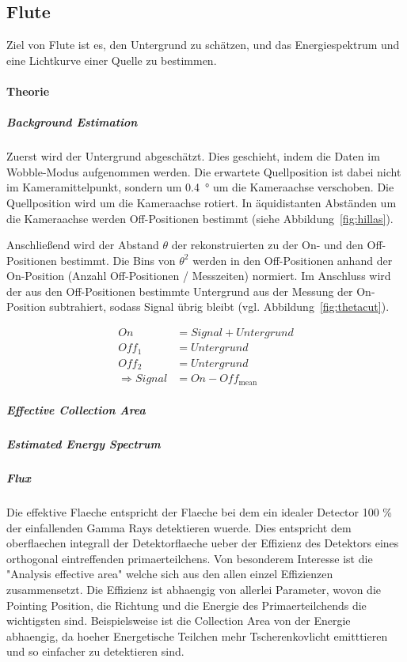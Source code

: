 \subsection{Flute}%
\label{sub:flute}

Ziel von Flute ist es,
den Untergrund zu schätzen,
und das Energiespektrum und
eine Lichtkurve einer Quelle zu bestimmen.

\paragraph{Theorie}%

\subparagraph{Background Estimation}
Zuerst wird der Untergrund abgeschätzt.
Dies geschieht, indem die Daten im Wobble-Modus aufgenommen werden.
Die erwartete Quellposition ist dabei nicht im
Kameramittelpunkt,
sondern um
\SI{0.4}{\degree} um die Kameraachse
verschoben.
Die Quellposition wird um die Kameraachse rotiert.
In äquidistanten Abständen um die Kameraachse werden Off-Positionen bestimmt
(siehe Abbildung~\ref{fig:hillas}).

Anschließend wird der Abstand $\theta$ der rekonstruierten
zu der On- und den Off-Positionen bestimmt.
Die Bins von $\theta^2$ werden in den Off-Positionen
anhand der On-Position (Anzahl Off-Positionen / Messzeiten) normiert.
Im Anschluss wird der aus den Off-Positionen bestimmte Untergrund
aus der Messung der On-Position subtrahiert, sodass Signal übrig bleibt
(vgl. Abbildung~\ref{fig:thetacut}).


\begin{align*}
    On &= Signal + Untergrund \\
    Off_{1} &= Untergrund \\
    Off_{2} &= Untergrund \\
    \Rightarrow Signal &= On - Off_{\text{mean}}
\end{align*}

\subparagraph{Effective Collection Area}
\subparagraph{Estimated Energy Spectrum}
\subparagraph{Flux}
Die effektive Flaeche entspricht der Flaeche bei dem ein idealer Detector 100 \%
der einfallenden Gamma Rays detektieren wuerde.
Dies entspricht dem oberflaechen integrall der Detektorflaeche 
ueber der Effizienz des Detektors eines orthogonal eintreffenden
primaerteilchens.
Von besonderem Interesse ist die "Analysis effective area" welche sich aus den
allen einzel Effizienzen zusammensetzt. 
Die Effizienz ist abhaengig von allerlei Parameter,
wovon die Pointing Position, die Richtung und die Energie des Primaerteilchends 
die wichtigsten sind.
Beispielsweise ist die Collection Area von der Energie abhaengig, da hoeher
Energetische Teilchen mehr Tscherenkovlicht emitttieren und so einfacher zu
detektieren sind.

